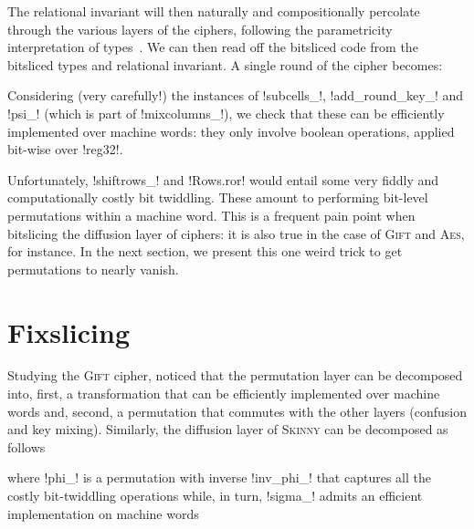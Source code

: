 \documentclass[draft,english]{jflart}
\newcommand{\Skinny}{\textsc{Skinny}}
\newcommand{\Gift}{\textsc{Gift}}
\newcommand{\AES}{\textsc{Aes}}
\begin{document}
The relational invariant will then naturally and compositionally
percolate through the various layers of the ciphers, following the parametricity interpretation of types~\citep{lasson:param}. We can then read
off the bitsliced code from the bitsliced types and relational
invariant. A single round of the cipher becomes:
%


Considering (very carefully!) the instances of \coqe!subcells_!,
\coqe!add_round_key_! and \coqe!psi_! (which is part of
\coqe!mixcolumns_!), we check that these can be efficiently
implemented over machine words: they only involve boolean operations,
applied bit-wise over \coqe!reg32!.

Unfortunately, \coqe!shiftrows_! and \coqe!Rows.ror! would entail some
very fiddly and computationally costly bit twiddling. These amount to
performing bit-level permutations within a machine word. This is a
frequent pain point when bitslicing the diffusion layer of ciphers: it
is also true in the case of \Gift{} and \AES{}, for instance. In the
next section, we present this one weird trick to get permutations to
nearly vanish.

\section{Fixslicing}
\label{sec:fixslicing}




Studying the \Gift{} cipher, \citet{adominicai:fixslicing-gift} noticed that the
permutation layer can be decomposed into, first, a transformation that
can be efficiently implemented over machine words and, second, a
permutation that commutes with the other layers (confusion and key
mixing). Similarly, the diffusion layer of \Skinny{} can be decomposed as
follows
%
\begin{prop}
\end{prop}
%
%
where \coqe!phi_! is a permutation with inverse \coqe!inv_phi_! that
captures all the costly bit-twiddling operations
%
%
%
while, in turn, \coqe!sigma_! admits an efficient implementation on
machine words
%
\end{document}
